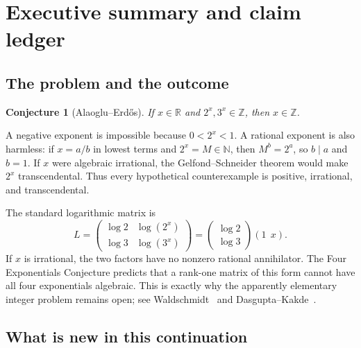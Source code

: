 \documentclass[11pt]{article}
\newcommand{\N}{\mathbb N}
\newcommand{\Z}{\mathbb Z}
\newcommand{\R}{\mathbb R}
\newcommand{\1}{\mathbf 1}
\theoremstyle{plain}
\newtheorem{conjecture}[theorem]{Conjecture}
\theoremstyle{definition}
\theoremstyle{remark}
\begin{document}
\tableofcontents
\newpage

\section{Executive summary and claim ledger}

\subsection{The problem and the outcome}

\begin{conjecture}[Alaoglu--Erd\H{o}s]
If $x\in\R$ and $2^x,3^x\in\Z$, then $x\in\Z$.
\end{conjecture}

A negative exponent is impossible because $0<2^x<1$.  A rational exponent is
also harmless: if $x=a/b$ in lowest terms and $2^x=M\in\N$, then
$M^b=2^a$, so $b\mid a$ and $b=1$.  If $x$ were algebraic irrational, the
Gelfond--Schneider theorem would make $2^x$ transcendental.  Thus every
hypothetical counterexample is positive, irrational, and transcendental.

The standard logarithmic matrix is
\begin{equation}\label{eq:rank-one-log-matrix}
 L=\begin{pmatrix}\log2&\log(2^x)\\[2pt]\log3&\log(3^x)\end{pmatrix}
 =\begin{pmatrix}\log2\\ \log3\end{pmatrix}(1\ \ x).
\end{equation}
If $x$ is irrational, the two factors have no nonzero rational annihilator.
The Four Exponentials Conjecture predicts that a rank-one matrix of this form
cannot have all four exponentials algebraic.  This is exactly why the
apparently elementary integer problem remains open; see
Waldschmidt~\cite{WaldschmidtFourExp} and
Dasgupta--Kakde~\cite{DasguptaKakde}.

\subsection{What is new in this continuation}
\end{document}
